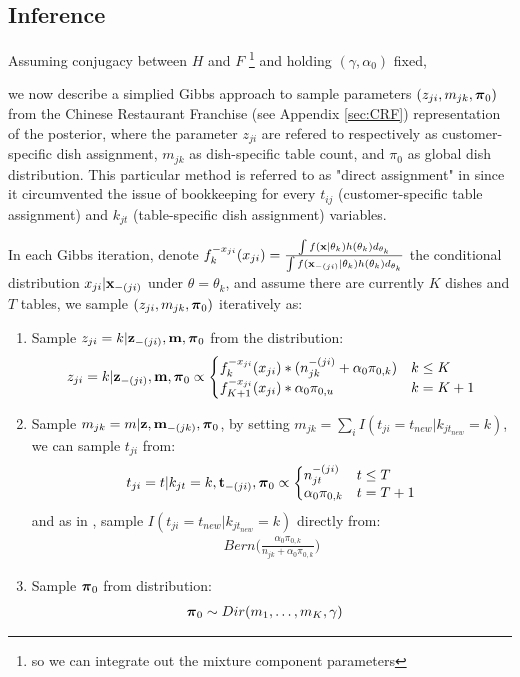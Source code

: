 \documentclass{article} %
\begin{document}
\subsection{Inference}
Assuming conjugacy between $H$ and $F$ \footnote{so we can integrate out the mixture component parameters} and holding $(\gamma, \alpha_0)$ fixed, 

we now describe a simplied Gibbs approach to sample parameters $(z_{ji}, m_{jk}, \boldsymbol{\pi}_0)$ from the Chinese Restaurant Franchise (see Appendix \ref{sec:CRF}) representation of the posterior, where the parameter $z_{ji}$ are refered to respectively as customer-specific dish assignment, $m_{jk}$ as  dish-specific table count, and $\pi_0$ as global dish distribution. This particular method is  referred to as "direct assignment" in \cite{teh_hierarchical_2006} since it circumvented the issue of bookkeeping for every $t_{ij}$ (customer-specific table assignment) and $k_{jt}$ (table-specific dish assignment) variables.

In each Gibbs iteration, denote $f_k^{-x_{ji}}(x_{ji}) = 
\frac{\int f({\bf x}|\theta_k) h(\theta_k) d_{\theta_k}}
{\int f({\bf x}_{-(ji)}|\theta_k) h(\theta_k) d_{\theta_k}}$ the conditional distribution $x_{ji} | {\bf x}_{-(ji)}$ under $\theta = \theta_k$, and assume there are currently $K$ dishes and $T$ tables, we sample $(z_{ji}, m_{jk}, \boldsymbol{\pi}_0)$ iteratively as:
\begin{enumerate}
\item Sample $z_{ji} = k | {\bf z}_{-(ji)}, {\bf m}, \boldsymbol{\pi}_0$ from the distribution:
\begin{align*}
z_{ji} = k | \bz_{-(ji)}, \bm, \bpi_0 \propto 
\left\{\begin{matrix*}[l]
f_k^{-x_{ji}}(x_{ji}) * (n_{jk}^{-(ji)} + \alpha_0 \pi_{0, k})  & k \leq K
\\ 
f_{K+1}^{-x_{ji}}(x_{ji}) * \alpha_0 \pi_{0, u}   & k = K+1
\end{matrix*}\right.
\end{align*}
\item Sample $m_{jk} = m | {\bf z}, {\bf m}_{-(jk)}, \boldsymbol{\pi}_0$, by setting $m_{jk} = \sum_{i} I(t_{ji} = t_{new}|k_{jt_{new}} = k)$,
we can sample $t_{ji}$ from:
\begin{align*}
t_{ji} = t | k_{jt} = k, \bt_{-(ji)}, \bpi_0 \propto
\left\{\begin{matrix*}[l]
n_{jt}^{-(ji)}  & t \leq T
\\ 
\alpha_0 \pi_{0, k}  & t = T+1
\end{matrix*}\right.
\end{align*}
and as in \cite{fox_bayesian_2009}, sample $I(t_{ji} = t_{new}|k_{jt_{new}} = k)$ directly from:
\begin{align*}
Bern \Big(\frac{\alpha_0 \pi_{0, k}}{n_{jk} + \alpha_0 \pi_{0, k}} \Big) 
\end{align*}

\item Sample $\boldsymbol{\pi}_0$ from distribution:
\begin{align*}
\boldsymbol{\pi}_0 & \sim Dir(m_1, \dots, m_K, \gamma)
\end{align*}
\end{enumerate}
\end{document}
